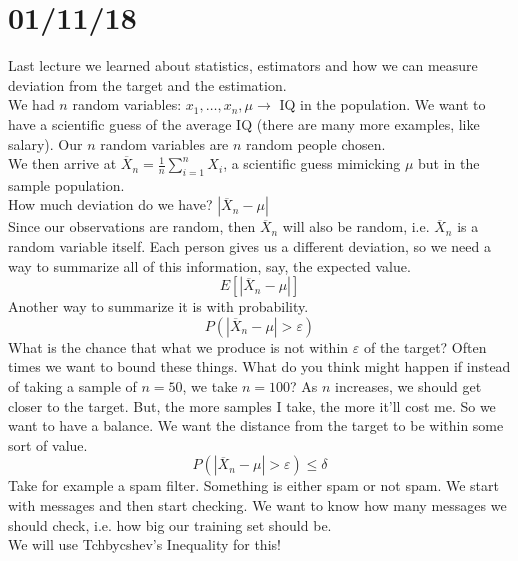 \documentclass[12 pt]{article}
\begin{document}
        \section{01/11/18}
        Last lecture we learned about statistics, estimators and how
        we can measure deviation from the target and the estimation.
        \\ We had $n$ random variables: $x_1, \ldots, x_n, \mu
        \rightarrow$ IQ in the population. We want to have a
        scientific guess of the average IQ (there are many more
        examples, like salary). Our $n$ random variables are $n$
        random people chosen.
        \\ We then arrive at $\overline{X}_n =
        \frac{1}{n}\sum_{i=1}^nX_i$, a scientific guess mimicking
        $\mu$ but in the sample population.
        \\ How much deviation do we have? $|\overline{X}_n - \mu|$
        \\ Since our observations are random, then $\overline{X}_n$
        will also be random, i.e. $\overline{X}_n$ is a random
        variable itself. Each person gives us a different deviation,
        so we need a way to summarize all of this information, say,
        the expected value.
        $$ E[|\overline{X}_n - \mu |]$$
        Another way to summarize it is with probability.
        $$ P(|\overline{X}_n - \mu | > \varepsilon)$$
        What is the chance that what we produce is not within
        $\varepsilon$ of the target? Often times we want to bound
        these things. What do you think might happen if instead of
        taking a sample of $n=50$, we take $n=100$? As $n$ increases,
        we should get closer to the target. But, the more samples I
        take, the more it'll cost me. So we want to have a balance. We
        want the distance from the target to be within some sort of
        value.
        $$P(| \overline{X}_n - \mu| > \varepsilon) \leq \delta$$
        Take for example a spam filter. Something is either spam or
        not spam. We start with messages and then start checking. We
        want to know how many messages we should check, i.e. how big
        our training set should be.
        \\ We will use Tchbycshev's Inequality for this!
\end{document}
